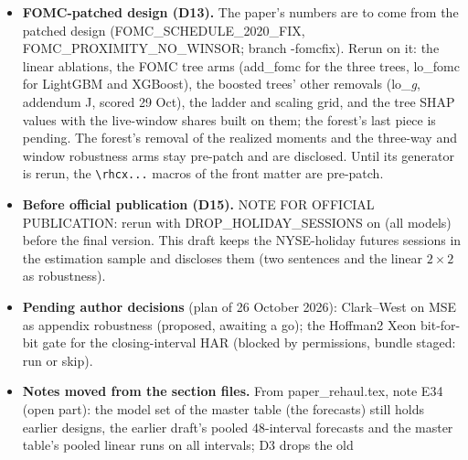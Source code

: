 \begin{itemize}
\begin{itemize}
    retains, as text ``a--b''), \texttt{rhldEB...} (the every-bar readings); the monthly \texttt{ladder...} macros stay
    for the forest and the window grid.
    relayed by DATA).
  \fi
  \item \textbf{FOMC-patched design (D13).} The paper's numbers are to come from the patched design
    (FOMC\_SCHEDULE\_2020\_FIX, FOMC\_PROXIMITY\_NO\_WINSOR; branch -fomcfix). Rerun on it: the linear ablations, the
    FOMC tree arms (add\_fomc for the three trees, lo\_fomc for LightGBM and XGBoost), the boosted trees' other
    removals (lo\_\textit{g}, addendum J, scored 29 Oct), the ladder and scaling grid, and the tree SHAP values with the
    live-window shares built on them; the forest's last piece is pending. The forest's removal of the realized moments
    and the three-way and window robustness arms stay pre-patch and are disclosed. Until its generator is rerun, the
    \texttt{\textbackslash rhcx...} macros of the front matter are pre-patch.
  \item \textbf{Before official publication (D15).} NOTE FOR OFFICIAL PUBLICATION: rerun with
    DROP\_HOLIDAY\_SESSIONS on (all models) before the final version. This draft keeps the NYSE-holiday futures
    sessions in the estimation sample and discloses them (two sentences and the linear $2 \times 2$ as robustness).
  \item \textbf{Pending author decisions} (plan of 26 October 2026): Clark--West on MSE as appendix robustness
    (proposed, awaiting a go); the Hoffman2 Xeon bit-for-bit gate for the closing-interval HAR (blocked by
    permissions, bundle staged: run or skip).
  \item \textbf{Notes moved from the section files.} From paper\_rehaul.tex, note E34 (open part): the model set of
    the master table (the \cmMasterN{} forecasts) still holds earlier designs, the earlier draft's pooled 48-interval
    forecasts and the master table's pooled linear runs on all \rhdmNIntervals{} intervals; D3 drops the old

\end{itemize}
\end{itemize}
